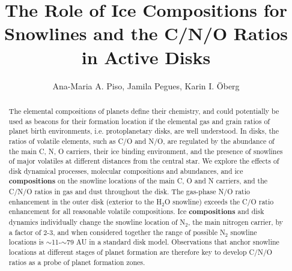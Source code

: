 \documentclass[apj]{emulateapj}
\begin{document}


\title{The Role of Ice Compositions for Snowlines and the C/N/O Ratios in Active Disks}

\author{Ana-Maria A. Piso, Jamila Pegues, Karin I. \"Oberg}


\begin{abstract}
The elemental compositions of planets define their chemistry, and could potentially be used as beacons for their formation location if the elemental gas and grain ratios of planet birth environments, i.e. protoplanetary disks, are well understood. In disks, the ratios of volatile elements, such as C/O and N/O, are regulated by the abundance of the main C, N, O carriers, their ice binding environment, and the presence of snowlines of major volatiles at different distances from the central star. We explore the effects of disk dynamical processes, molecular compositions and abundances, and ice \textbf{compositions} on the snowline locations of the main C, O and N carriers, and the C/N/O ratios in gas and dust throughout the disk. The gas-phase N/O ratio enhancement in the outer disk (exterior to the H$_2$O snowline) exceeds the C/O ratio enhancement for all reasonable volatile compositions. Ice \textbf{compositions} and disk dynamics individually change the snowline location of N$_2$, the main nitrogen carrier, by a factor of 2-3, and when considered together the range of possible N$_2$ snowline locations is $\sim$11-$\sim$79 AU in a standard disk model. Observations that anchor snowline locations at different stages of planet formation are therefore key to develop C/N/O ratios as a probe of planet formation zones. 


\end{abstract}
\end{document}
